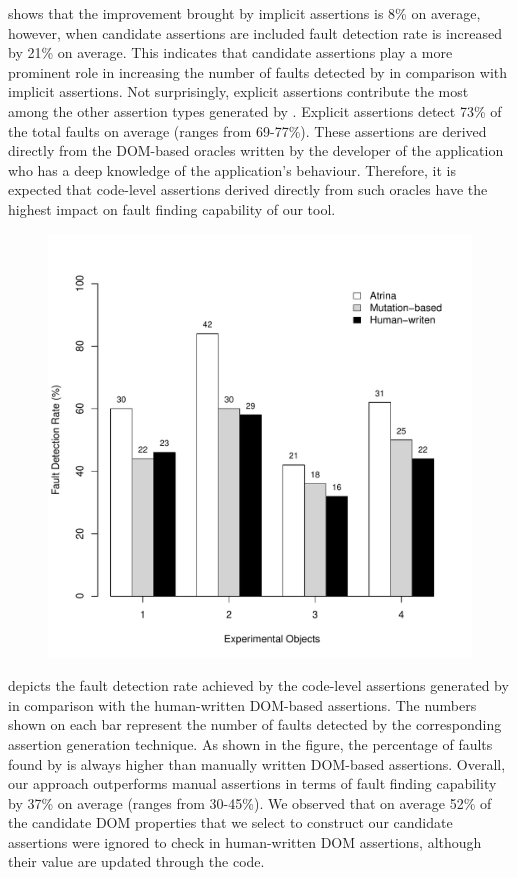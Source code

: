  shows that the improvement brought by implicit assertions is 8\% on average, however, when candidate assertions are included fault detection rate is increased by 21\% on average. This indicates that candidate assertions play a more prominent role in increasing the number of faults detected by \tool in comparison with implicit assertions. Not surprisingly, explicit assertions contribute the most among the other assertion types generated by \tool. Explicit assertions detect 73\% of the total faults on average (ranges from 69-77\%). These assertions are derived directly from the DOM-based oracles written by the developer of the application who has a deep knowledge of the application's behaviour. Therefore, it is expected that code-level assertions derived directly from such oracles have the highest impact on fault finding capability of our tool.        
\begin{figure}[!t]
  \centering
  \includegraphics[width=1\hsize]{r-scripts/barplot-faultDetectionRate}
  \vspace{-0.18in}   
  \vspace{-0.1in} 
  \label{Fig:barplot-faultDetectionRate}
\end{figure}
 depicts the fault detection rate achieved by the code-level assertions generated by \tool in comparison with the human-written DOM-based assertions. The numbers shown on each bar represent the number of faults detected by the corresponding assertion generation technique. As shown in the figure, the percentage of faults found by \tool is always higher than manually written DOM-based assertions. Overall, our approach outperforms manual assertions in terms of fault finding capability by 37\% on average (ranges from 30-45\%). We observed that on average 52\% of the candidate DOM properties that we select to construct our candidate assertions were ignored to check in human-written DOM assertions, although their value are updated through the \javascript code.
